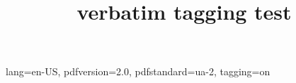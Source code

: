 \DocumentMetadata
  {
    lang=en-US,
    pdfversion=2.0,
    pdfstandard=ua-2,
    tagging=on
  }
\begin{filecontents*}{tst.tex}
Some verbatim text
}%
\end{filecontents*}
\documentclass{article}
\usepackage{verbatim}

\title{verbatim tagging test}





\begin{verbatim}
Some verbatim text
}% ^_
\end{verbatim}

